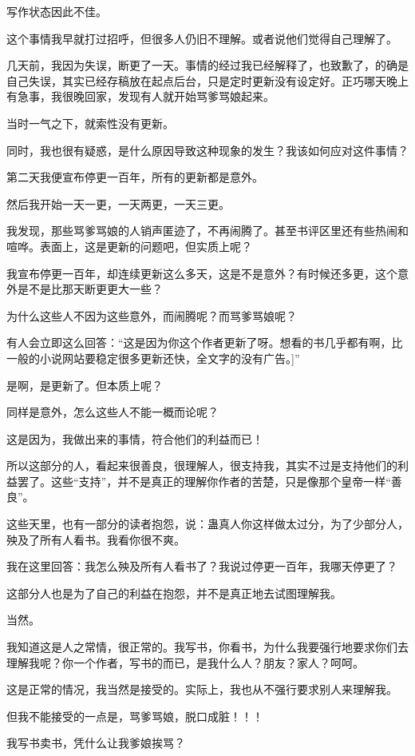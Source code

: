 \begin{this_body}
写作状态因此不佳。

这个事情我早就打过招呼，但很多人仍旧不理解。或者说他们觉得自己理解了。

几天前，我因为失误，断更了一天。事情的经过我已经解释了，也致歉了，的确是自己失误，其实已经存稿放在起点后台，只是定时更新没有设定好。正巧哪天晚上有急事，我很晚回家，发现有人就开始骂爹骂娘起来。

当时一气之下，就索性没有更新。

同时，我也很有疑惑，是什么原因导致这种现象的发生？我该如何应对这件事情？

第二天我便宣布停更一百年，所有的更新都是意外。

然后我开始一天一更，一天两更，一天三更。

我发现，那些骂爹骂娘的人销声匿迹了，不再闹腾了。甚至书评区里还有些热闹和喧哗。表面上，这是更新的问题吧，但实质上呢？

我宣布停更一百年，却连续更新这么多天，这是不是意外？有时候还多更，这个意外是不是比那天断更更大一些？

为什么这些人不因为这些意外，而闹腾呢？而骂爹骂娘呢？

有人会立即这么回答：“这是因为你这个作者更新了呀。想看的书几乎都有啊，比一般的小说网站要稳定很多更新还快，全文字的没有广告。]”

是啊，是更新了。但本质上呢？

同样是意外，怎么这些人不能一概而论呢？

这是因为，我做出来的事情，符合他们的利益而已！

所以这部分的人，看起来很善良，很理解人，很支持我，其实不过是支持他们的利益罢了。这些“支持”，并不是真正的理解你作者的苦楚，只是像那个皇帝一样“善良”。

这些天里，也有一部分的读者抱怨，说：蛊真人你这样做太过分，为了少部分人，殃及了所有人看书。我看你很不爽。

我在这里回答：我怎么殃及所有人看书了？我说过停更一百年，我哪天停更了？

这部分人也是为了自己的利益在抱怨，并不是真正地去试图理解我。

当然。

我知道这是人之常情，很正常的。我写书，你看书，为什么我要强行地要求你们去理解我呢？你一个作者，写书的而已，是我什么人？朋友？家人？呵呵。

这是正常的情况，我当然是接受的。实际上，我也从不强行要求别人来理解我。

但我不能接受的一点是，骂爹骂娘，脱口成脏！！！

我写书卖书，凭什么让我爹娘挨骂？


\end{this_body}
